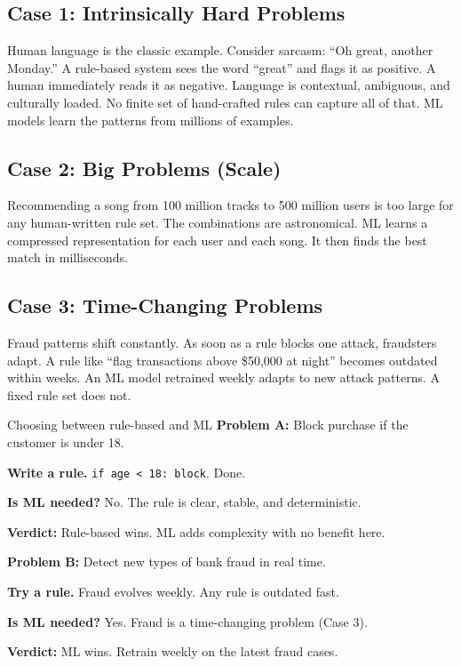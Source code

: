 \documentclass[a4paper,11pt]{article}
\begin{document}
\subsection{Case 1: Intrinsically Hard Problems}

Human language is the classic example.
Consider sarcasm: ``Oh great, another Monday.''
A rule-based system sees the word ``great'' and flags it as positive.
A human immediately reads it as negative.
Language is contextual, ambiguous, and culturally loaded.
No finite set of hand-crafted rules can capture all of that.
ML models learn the patterns from millions of examples.

\subsection{Case 2: Big Problems (Scale)}

Recommending a song from 100 million tracks to 500 million users is too large
for any human-written rule set.
The combinations are astronomical.
ML learns a compressed representation for each user and each song.
It then finds the best match in milliseconds.

\subsection{Case 3: Time-Changing Problems}

Fraud patterns shift constantly.
As soon as a rule blocks one attack, fraudsters adapt.
A rule like ``flag transactions above \textrm{\$}50{,}000 at night'' becomes
outdated within weeks.
An ML model retrained weekly adapts to new attack patterns.
A fixed rule set does not.

\begin{worked}{Choosing between rule-based and ML}
\textbf{Problem A:} Block purchase if the customer is under 18.
\begin{steps}
  \item \textbf{Write a rule.} \texttt{if age < 18: block}. Done.
  \item \textbf{Is ML needed?} No. The rule is clear, stable, and deterministic.
  \item \textbf{Verdict:} Rule-based wins. ML adds complexity with no benefit here.
\end{steps}
\textbf{Problem B:} Detect new types of bank fraud in real time.
\begin{steps}
  \item \textbf{Try a rule.} Fraud evolves weekly. Any rule is outdated fast.
  \item \textbf{Is ML needed?} Yes. Fraud is a time-changing problem (Case 3).
  \item \textbf{Verdict:} ML wins. Retrain weekly on the latest fraud cases.
\end{steps}
\end{worked}
\end{document}
